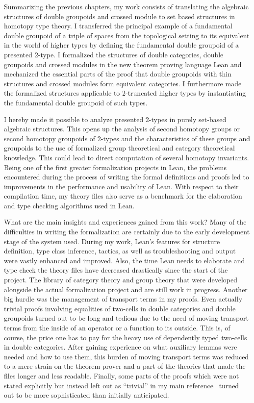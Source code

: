 Summarizing the previous chapters, my work consists of translating the algebraic
structures of double groupoids and crossed module to set based structures in
homotopy type theory.
I transferred the principal example of a fundamental double groupoid of a triple
of spaces from the topological setting to its equivalent in the world of higher
types by defining the fundamental double groupoid of a presented 2-type.
I formalized the structures of double categories, double groupoids and crossed
modules in the new theorem proving language Lean and mechanized the essential
parts of the proof that double groupoids with thin structures and crossed modules
form equivalent categories.
I furthermore made the formalized structures applicable to 2-truncated higher types by
instantiating the fundamental double groupoid of such types.

I hereby made it possible to analyze presented 2-types in purely set-based algebraic
structures.
This opens up the analysis of second homotopy groups or second homotopy groupoids
of 2-types and the characteristics of these groups and groupoids to the use of
formalized group theoretical and category theoretical knowledge.
This could lead to direct computation of several homotopy invariants.
Being one of the first greater formalization projects in Lean, the problems encountered
during the process of writing the formal definitions and proofs led to improvements
in the performance and usability of Lean.
With respect to their compilation time, my theory files also serve as a benchmark
for the elaboration and type checking algorithms used in Lean.

What are the main insights and experiences gained from this work?
Many of the difficulties in writing the formalization are certainly due to the
early development stage of the system used.
During my work, Lean's features for structure definition, type class inference,
tactics, as well as troubleshooting and output were vastly enhanced and improved.
Also, the time Lean needs to elaborate and type check the theory files have decreased
drastically since the start of the project.
The library of category theory and group theory that were developed alongside the
actual formalization project and are still work in progress.
Another big hurdle was the management of transport terms in my proofs.
Even actually trivial proofs involving equalities of two-cells in double
categories and double groupoids turned out to be long and tedious due to the need
of moving transport terms from the inside of an operator or a function to its
outside.
This is, of course, the price one has to pay for the heavy use of dependently
typed two-cells in double categories.
After gaining experience on what auxiliary lemmas were needed and how to use them,
this burden of moving transport terms was reduced to a mere strain on the theorem
prover and a part of the theories that made the files longer and less readable.
Finally, some parts of the proofs which were not stated explicitly but instead
left out as ``trivial'' in my main reference~\cite{nat} turned out to be more
sophisticated than initially anticipated.

